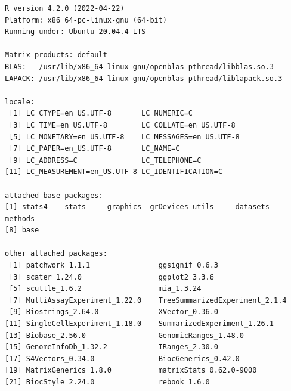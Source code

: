 \documentclass[
]{book}
\begin{document}
\begin{verbatim}
R version 4.2.0 (2022-04-22)
Platform: x86_64-pc-linux-gnu (64-bit)
Running under: Ubuntu 20.04.4 LTS

Matrix products: default
BLAS:   /usr/lib/x86_64-linux-gnu/openblas-pthread/libblas.so.3
LAPACK: /usr/lib/x86_64-linux-gnu/openblas-pthread/liblapack.so.3

locale:
 [1] LC_CTYPE=en_US.UTF-8       LC_NUMERIC=C              
 [3] LC_TIME=en_US.UTF-8        LC_COLLATE=en_US.UTF-8    
 [5] LC_MONETARY=en_US.UTF-8    LC_MESSAGES=en_US.UTF-8   
 [7] LC_PAPER=en_US.UTF-8       LC_NAME=C                 
 [9] LC_ADDRESS=C               LC_TELEPHONE=C            
[11] LC_MEASUREMENT=en_US.UTF-8 LC_IDENTIFICATION=C       

attached base packages:
[1] stats4    stats     graphics  grDevices utils     datasets  methods  
[8] base     

other attached packages:
 [1] patchwork_1.1.1                ggsignif_0.6.3                
 [3] scater_1.24.0                  ggplot2_3.3.6                 
 [5] scuttle_1.6.2                  mia_1.3.24                    
 [7] MultiAssayExperiment_1.22.0    TreeSummarizedExperiment_2.1.4
 [9] Biostrings_2.64.0              XVector_0.36.0                
[11] SingleCellExperiment_1.18.0    SummarizedExperiment_1.26.1   
[13] Biobase_2.56.0                 GenomicRanges_1.48.0          
[15] GenomeInfoDb_1.32.2            IRanges_2.30.0                
[17] S4Vectors_0.34.0               BiocGenerics_0.42.0           
[19] MatrixGenerics_1.8.0           matrixStats_0.62.0-9000       
[21] BiocStyle_2.24.0               rebook_1.6.0                  


\end{verbatim}
\end{document}
